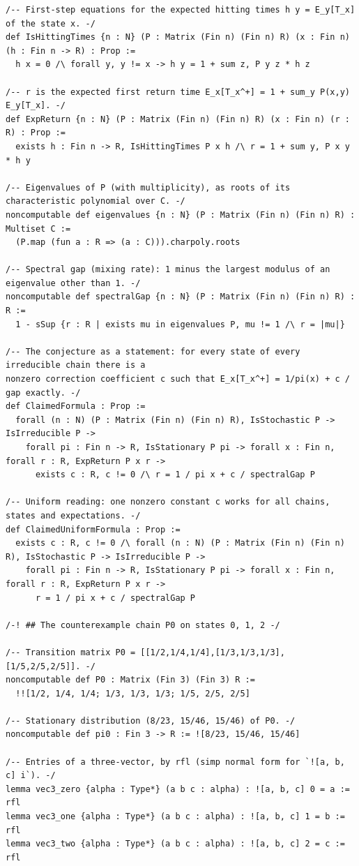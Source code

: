 \documentclass[11pt,a4paper]{article}
\begin{document}
\begin{lstlisting}[language={}]
/-- First-step equations for the expected hitting times h y = E_y[T_x] of the state x. -/
def IsHittingTimes {n : N} (P : Matrix (Fin n) (Fin n) R) (x : Fin n) (h : Fin n -> R) : Prop :=
  h x = 0 /\ forall y, y != x -> h y = 1 + sum z, P y z * h z

/-- r is the expected first return time E_x[T_x^+] = 1 + sum_y P(x,y) E_y[T_x]. -/
def ExpReturn {n : N} (P : Matrix (Fin n) (Fin n) R) (x : Fin n) (r : R) : Prop :=
  exists h : Fin n -> R, IsHittingTimes P x h /\ r = 1 + sum y, P x y * h y

/-- Eigenvalues of P (with multiplicity), as roots of its characteristic polynomial over C. -/
noncomputable def eigenvalues {n : N} (P : Matrix (Fin n) (Fin n) R) : Multiset C :=
  (P.map (fun a : R => (a : C))).charpoly.roots

/-- Spectral gap (mixing rate): 1 minus the largest modulus of an eigenvalue other than 1. -/
noncomputable def spectralGap {n : N} (P : Matrix (Fin n) (Fin n) R) : R :=
  1 - sSup {r : R | exists mu in eigenvalues P, mu != 1 /\ r = |mu|}

/-- The conjecture as a statement: for every state of every irreducible chain there is a
nonzero correction coefficient c such that E_x[T_x^+] = 1/pi(x) + c / gap exactly. -/
def ClaimedFormula : Prop :=
  forall (n : N) (P : Matrix (Fin n) (Fin n) R), IsStochastic P -> IsIrreducible P ->
    forall pi : Fin n -> R, IsStationary P pi -> forall x : Fin n, forall r : R, ExpReturn P x r ->
      exists c : R, c != 0 /\ r = 1 / pi x + c / spectralGap P

/-- Uniform reading: one nonzero constant c works for all chains, states and expectations. -/
def ClaimedUniformFormula : Prop :=
  exists c : R, c != 0 /\ forall (n : N) (P : Matrix (Fin n) (Fin n) R), IsStochastic P -> IsIrreducible P ->
    forall pi : Fin n -> R, IsStationary P pi -> forall x : Fin n, forall r : R, ExpReturn P x r ->
      r = 1 / pi x + c / spectralGap P

/-! ## The counterexample chain P0 on states 0, 1, 2 -/

/-- Transition matrix P0 = [[1/2,1/4,1/4],[1/3,1/3,1/3],[1/5,2/5,2/5]]. -/
noncomputable def P0 : Matrix (Fin 3) (Fin 3) R :=
  !![1/2, 1/4, 1/4; 1/3, 1/3, 1/3; 1/5, 2/5, 2/5]

/-- Stationary distribution (8/23, 15/46, 15/46) of P0. -/
noncomputable def pi0 : Fin 3 -> R := ![8/23, 15/46, 15/46]

/-- Entries of a three-vector, by rfl (simp normal form for `![a, b, c] i`). -/
lemma vec3_zero {alpha : Type*} (a b c : alpha) : ![a, b, c] 0 = a := rfl
lemma vec3_one {alpha : Type*} (a b c : alpha) : ![a, b, c] 1 = b := rfl
lemma vec3_two {alpha : Type*} (a b c : alpha) : ![a, b, c] 2 = c := rfl


\end{lstlisting}
\end{document}
